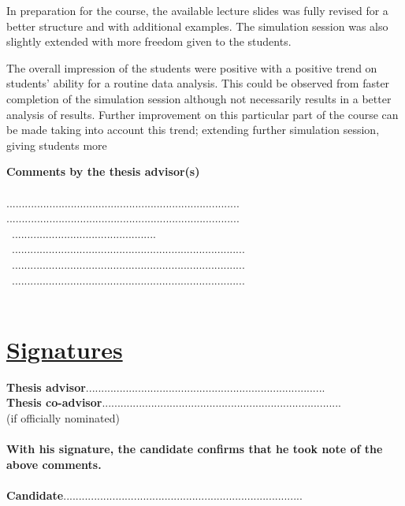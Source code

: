 \documentclass[11pt,titlepage]{article}
\begin{document}
In preparation for the course, the available lecture slides was fully revised
for a better structure and with additional examples.
The simulation session was also slightly extended with more freedom given to
the students.

The overall impression of the students were positive with a positive trend on
students' ability for a routine data analysis.
This could be observed from faster completion of the simulation session although
not necessarily results in a better analysis of results.
Further improvement on this particular part of the course can be made taking
into account this trend; extending further simulation session, giving students
more

\newpage
\noindent\textbf{Comments by the thesis advisor(s)}\\\\
............................................................................
............................................................................\\\
...............................................\\\
............................................................................\\\
............................................................................\\\
............................................................................\\\


\section*{\underline{Signatures}\\}
\noindent \textbf{Thesis advisor}\hspace{6.25cm}..............................................................................\vspace{0.5cm}\\

\noindent \textbf{Thesis co-advisor}\hspace{5.7cm}..............................................................................\\
\noindent  (if officially nominated)\\\\

\noindent \textbf{With his signature, the candidate confirms that he took note of the above comments.}\\\\
\textbf{Candidate}\hspace{7cm}..............................................................................\vspace{0.5cm}\\
\end{document}
